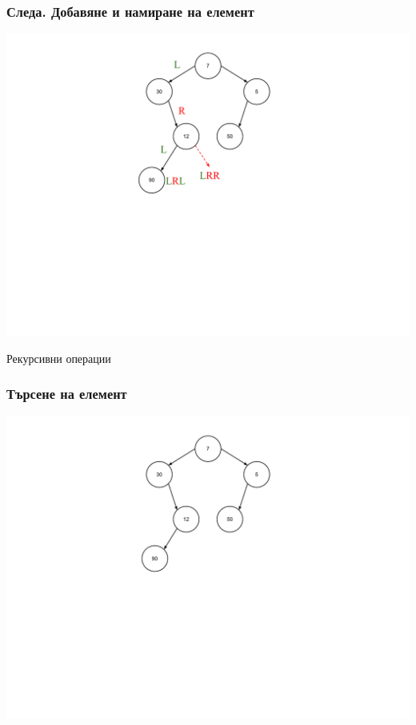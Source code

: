 \documentclass{beamer}
\begin{document}
\begin{frame}[fragile]
\frametitle{Следа. Добавяне и намиране на елемент}

\includegraphics[width=14cm]{images/tree_traces}

\end{frame}


\begin{frame}
\centerline{Рекурсивни операции}
\end{frame}


\begin{frame}[fragile]
\frametitle{Търсене на елемент}

\includegraphics[width=14cm]{images/tree_arbitrary}

\end{frame}
\end{document}

